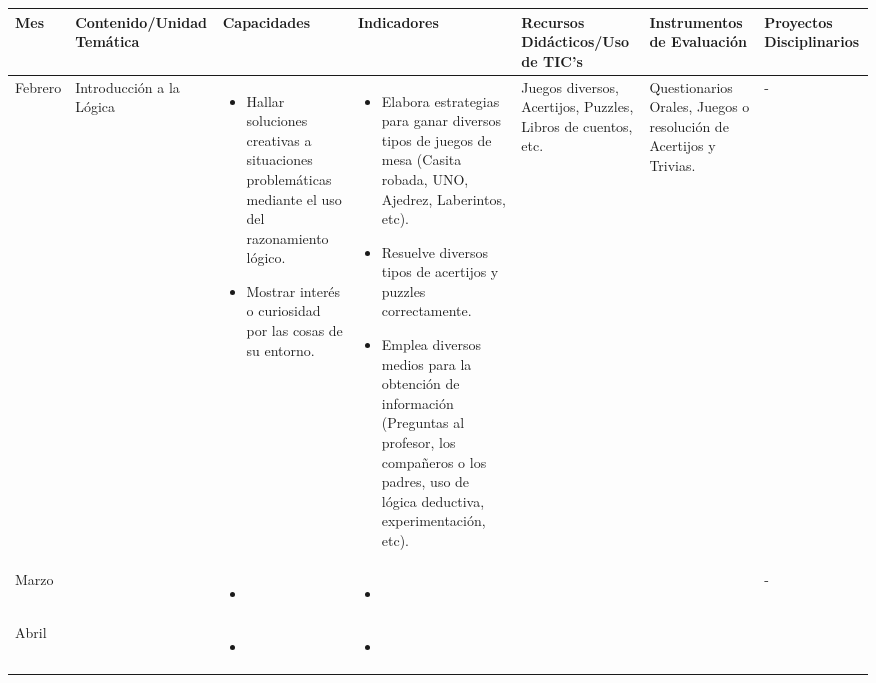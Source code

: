 \documentclass[landscape, a4paper, 10pt]{article}
\newcommand{\smallcellwidth}{0.7in}
\newcommand{\normalcellwidth}{1.2in}
\newcommand{\bigcellwidth}{2.0in}
\begin{document}
	\begin{longtable}{|m{\smallcellwidth}|p{\normalcellwidth}|p{\bigcellwidth}|p{\bigcellwidth}|p{\normalcellwidth}|p{\normalcellwidth}|p{\normalcellwidth}|}
	
		\hline
		\textbf{Mes} &
		\textbf{Contenido/Unidad Temática} &
		\textbf{Capacidades} &
		\textbf{Indicadores} &
		\textbf{Recursos Didácticos/Uso de TIC's} &
		\textbf{Instrumentos de Evaluación} &
		\textbf{Proyectos Disciplinarios} \\
		\hline
		\endhead
		Febrero &
		Introducción a la Lógica &
		\begin{itemize}
			\item Hallar soluciones creativas a situaciones problemáticas mediante el uso del razonamiento lógico.
			\item Mostrar interés o curiosidad por las cosas de su entorno.
		\end{itemize} &
		\begin{itemize}
			\item Elabora estrategias para ganar diversos tipos de juegos de mesa (Casita robada, UNO, Ajedrez, Laberintos, etc).
			\item Resuelve diversos tipos de acertijos y puzzles correctamente.
			\item Emplea diversos medios para la obtención de información (Preguntas al profesor, los compañeros o los padres, uso de lógica deductiva, experimentación, etc).
 		\end{itemize} &
		Juegos diversos, Acertijos, Puzzles, Libros de cuentos, etc. &
		Questionarios Orales, Juegos o resolución de Acertijos y Trivias. &
		 - \\
		\hline
		Marzo &
		 &
		\begin{itemize}
			\item 
		\end{itemize} &
		\begin{itemize}
			\item 
		\end{itemize} &
		  &
		  &
		 - \\
		\hline
		Abril &
		 &
		\begin{itemize}
			\item 
		\end{itemize} &
		\begin{itemize}
			\item 
		\end{itemize} &

\end{longtable}
\end{document}
